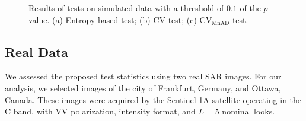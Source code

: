 \documentclass[remotesensing,article,submit,moreauthors,pdftex]{Definitions/mdpi}
\begin{document}
\begin{figure}[H]

{\centering {}

}

\caption{Results of tests on simulated data with a threshold of $0.1$ of the $p$-value. (a) Entropy-based test; (b) CV test; (c) $\text{CV}_{\text{MnAD}}$ test.}\label{fig:sim_SAR_Images_p05}
\end{figure}

\hypertarget{real-data}{%
\subsection{Real Data}\label{real-data}}

We assessed the proposed test statistics using two real SAR images. For
our analysis, we selected images of the city of Frankfurt, Germany, and
Ottawa, Canada. These images were acquired by the Sentinel-1A satellite
operating in the C band, with VV polarization, intensity format, and
\(L=5\) nominal looks.
\end{document}
